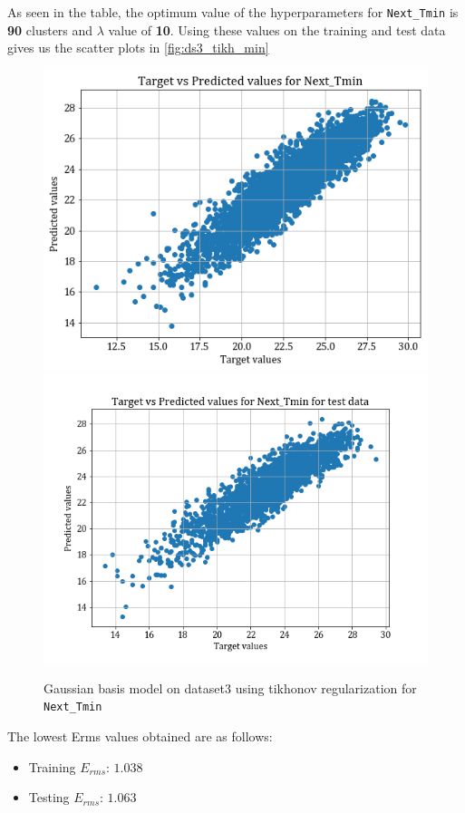 \documentclass[12pt,a4paper]{article}
\def\tt#1{\texttt{#1}}
\begin{document}

As seen in the table, the optimum value of the hyperparameters for  \tt{Next\_Tmin} is \textbf{90} clusters and $\lambda$ value of \textbf{10}. Using these values on the training and test data gives us the scatter plots in \autoref{fig:ds3_tikh_min}
\begin{figure}
    \centering
    \includegraphics[scale = 0.4]{images/train_ds3_tikh_min.png}
    \includegraphics[scale = 0.4]{images/test_ds3_tikh_min.png}
    \caption{Gaussian basis model on dataset3 using tikhonov regularization for \tt{Next\_Tmin}}
    \label{fig:ds3_tikh_min}
\end{figure}
The lowest Erms values obtained are as follows:
\begin{itemize}
    \itemsep0em
    \item Training $E_{rms}$: $1.038$
    \item Testing $E_{rms}$: $1.063$
\end{itemize}
\end{document}
